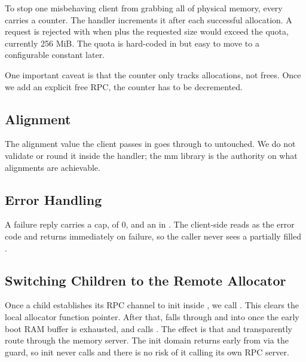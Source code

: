 To stop one misbehaving client from grabbing all of physical memory, every
 carries a  counter. The handler increments
it after each successful allocation. A request is rejected with
 when  plus the requested size would
exceed the quota, currently 256 MiB. The quota is hard-coded in
 but easy to move to a configurable constant later.

\medskip\noindent
One important caveat is that the counter only tracks allocations, not frees. Once we
add an explicit free RPC, the counter has to be decremented.

\subsection{Alignment}

The alignment value the client passes in  goes through
to  untouched. We do not validate or round it inside
the handler; the mm library is the authority on what alignments are achievable.

\subsection{Error Handling}

A failure reply carries a  cap,  of 0, and an
 in . The client-side  reads
 as the error code and returns immediately on failure, so the
caller never sees a partially filled .

\subsection{Switching Children to the Remote Allocator}

Once a child establishes its RPC channel to init inside
, we call .
This clears the local allocator function pointer. After that,
 falls through  and into
 once the early boot RAM buffer is exhausted, and
 calls . The effect is that
 and  transparently route through the memory server.
The init domain returns early from  via the
 guard, so init never calls 
and there is no risk of it calling its own RPC server.

